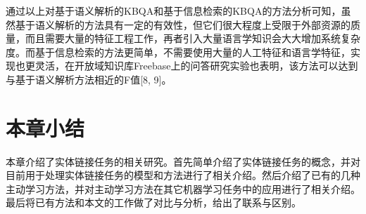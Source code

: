 通过以上对基于语义解析的KBQA和基于信息检索的KBQA的方法分析可知，虽然基于语义解析的方法具有一定的有效性，但它们很大程度上受限于外部资源的质量，而且需要大量的特征工程工作，再者引入大量语言学知识会大大增加系统复杂度。而基于信息检索的方法更简单，不需要使用大量的人工特征和语言学特征，实现也更灵活，在开放域知识库Freebase上的问答研究实验也表明，该方法可以达到与基于语义解析方法相近的F值[8, 9]。

\section{本章小结}
本章介绍了实体链接任务的相关研究。首先简单介绍了实体链接任务的概念，并对目前用于处理实体链接任务的模型和方法进行了相关介绍。然后介绍了已有的几种主动学习方法，并对主动学习方法在其它机器学习任务中的应用进行了相关介绍。最后将已有方法和本文的工作做了对比与分析，给出了联系与区别。